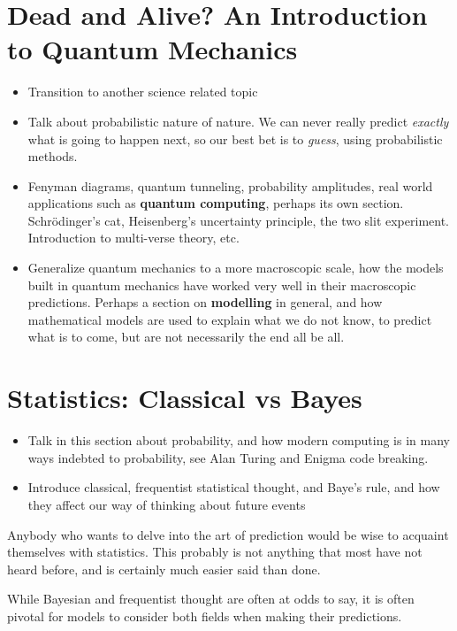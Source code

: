 \documentclass[12pt,twoside]{book}
\newcommand{\imp}[1]{\textbf{#1}}
\begin{document}
	\chapter[Quantum Mechanics]{Dead and Alive? An Introduction to Quantum Mechanics}
	\begin{itemize}
		\item Transition to another science related topic
		\item Talk about probabilistic nature of nature.  We can never really predict \emph{exactly} what is going to happen next, so our best bet is to \emph{guess}, using probabilistic methods.  
		\item Fenyman diagrams, quantum tunneling, probability amplitudes, real world applications such as \imp{quantum computing}, perhaps its own section.  Schr{\"o}dinger's cat, Heisenberg's uncertainty principle, the two slit experiment.  Introduction to multi-verse theory, etc.
		\item Generalize quantum mechanics to a more macroscopic scale, how the models built in quantum mechanics have worked very well in their macroscopic predictions.  Perhaps a section on \imp{modelling} in general, and how mathematical models are used to explain what we do not know, to predict what is to come, but are not necessarily the end all be all.  
	\end{itemize}
	\chapter{Statistics: Classical vs Bayes}
	\begin{itemize}
		\item Talk in this section about probability, and how modern computing is in many ways indebted to probability, see Alan Turing and Enigma code breaking.  
		\item Introduce classical, frequentist statistical thought, and Baye's rule, and how they affect our way of thinking about future events
	\end{itemize}
	Anybody who wants to delve into the art of prediction would be wise to acquaint themselves with statistics.  This probably is not anything that most have not heard before, and is certainly much easier said than done.  
	
	While Bayesian and frequentist thought are often at odds to say, it is often pivotal for models to consider both fields when making their predictions.
\end{document}
